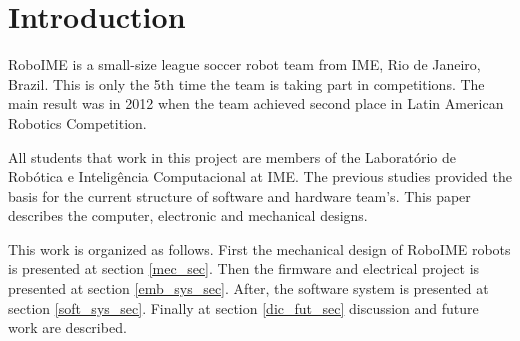 \section{Introduction}
    RoboIME is a small-size league soccer robot team from IME, Rio de Janeiro, Brazil. This
is only the 5th time the team is taking part in competitions. The main result was in 2012
when the team achieved second place in Latin American Robotics Competition.

All students that work in this project are members of the Laboratório de Robótica e
Inteligência Computacional at IME. The previous studies \cite{alexandre}\cite{marco} provided
the basis for the current structure of software and hardware team's. This paper describes the
computer, electronic and mechanical designs.

This work is organized as follows. First the mechanical design of RoboIME robots is presented at section \ref{mec_sec}. Then the firmware and electrical project is presented at section \ref{emb_sys_sec}. After, the software system is presented at section \ref{soft_sys_sec}. Finally at section \ref{dic_fut_sec} discussion and future work are described.
